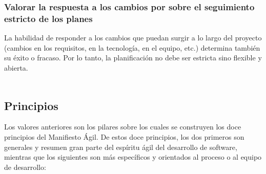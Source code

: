 \subsubsection{Valorar la respuesta a los cambios por sobre el seguimiento 
	estricto de los planes }
La habilidad de responder a los cambios que puedan surgir a lo 
largo del proyecto (cambios en los requisitos, en la tecnología, 
en el equipo, etc.) determina también su éxito o fracaso. Por lo 
tanto, la planificación no debe ser estricta sino flexible y abierta. 
\\
\\
\subsection{Principios}
Los     valores    anteriores    son    los  pilares    sobre    los  cuales    se 
construyen   los   doce   principios   del   Manifiesto   Ágil.   De   estos 
doce principios, los dos primeros son generales y resumen gran 
parte   del   espíritu   ágil   del   desarrollo   de   software,   mientras   que 
los siguientes son más específicos y orientados al proceso o al 
equipo de desarrollo:\\
\\
